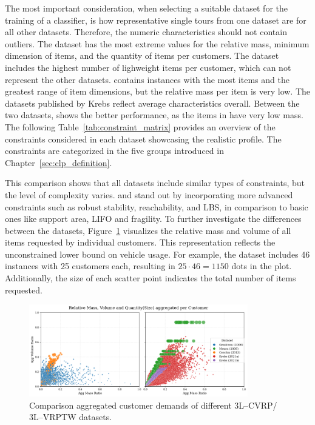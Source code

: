 

The most important consideration, when selecting a suitable dataset for the training of a classifier,
is how representative single tours from one dataset are for all other datasets. Therefore, the numeric characteristics
should not contain outliers. The \gendreauDataSetText dataset has the most extreme values for the relative mass, minimum dimension of items,
and the quantity of items per customers. The \mouraDataSetText dataset includes the highest number of lighweight items per customer,
which can not represent the other datasets. \ceschiaDataSetText contains instances with the most items and the greatest range
of item dimensions, but the relative mass per item is very low. The datasets published by Krebs
reflect average characteristics overall. Between the two datasets, \krebsADataSetText shows the better performance,
as the items in \krebsBDataSetText have very low mass.
The following Table~\ref{tab:constraint_matrix} provides an overview of the constraints considered
in each dataset showcasing the realistic profile. The constraints are categorized in the five groups introduced
in Chapter~\ref{sec:clp_definition}.
\clearpage


This comparison shows that all datasets include similar types of constraints, but the level
of complexity varies. \krebsADataSetText and \ceschiaDataSetText stand out by incorporating
more advanced constraints such as robust stability, reachability, and \gls{LBS}, in comparison to
basic ones like support area, \gls{LIFO} and fragility. To further investigate the differences
between the datasets, Figure~\ref{fig:dataset_comparison} visualizes the relative mass and
volume of all items requested by individual customers. This representation reflects the
unconstrained lower bound on vehicle usage. For example, the \mouraDataSetText dataset includes 46
instances with 25 customers each, resulting in $25 \cdot 46 = 1150$ dots in the plot.
Additionally, the size of each scatter point indicates the total number of items requested.

\begin{figure}[ht]
    \centering
    \includegraphics[width=0.85\textwidth]{pictures/comparison_datasets_3lcvrp.png}
    \caption{Comparison aggregated customer demands of different 3L--CVRP/ 3L--VRPTW datasets.}
    \label{fig:dataset_comparison}
\end{figure}

